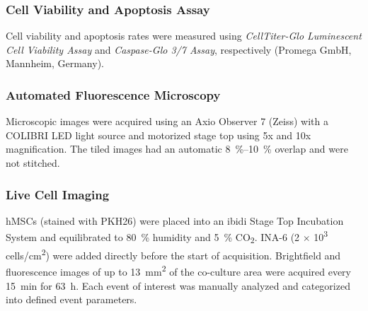 \subsubsection*{Cell Viability and Apoptosis Assay}
Cell viability and apoptosis rates were measured using \textit{CellTiter-Glo Luminescent
    Cell Viability Assay} and \textit{Caspase-Glo 3/7 Assay}, respectively (Promega GmbH,
Mannheim, Germany).



\subsubsection*{Automated Fluorescence Microscopy}
Microscopic images were acquired using an Axio Observer 7 (Zeiss) with a COLIBRI LED
light source and motorized stage top using 5x and 10x magnification. The tiled images had
an automatic \SIrange{8}{10}{\percent} overlap and were not stitched.



\subsubsection*{Live Cell Imaging}
hMSCs (stained with PKH26) were placed into an ibidi Stage Top Incubation System
and equilibrated to \SI{80}{\percent} humidity and \SI{5}{\percent}
CO\textsubscript{2}. INA-6 (2 $\times$ 10\textsuperscript{3}
cells/cm\textsuperscript{2}) were added directly before the start of
acquisition. Brightfield and fluorescence images of up to \SI{13}{\mm\squared}
of the co-culture area were acquired every \SI{15}{\minute} for \SI{63}{\hour}.
Each event of interest was manually analyzed and categorized into defined event
parameters.




